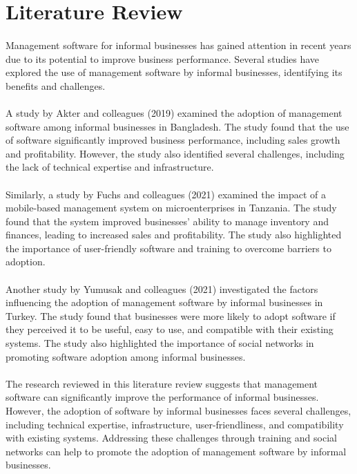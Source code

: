 \documentclass{article}
\begin{document}
\newpage


\section*{Literature Review}
\paragraph*{}
Management software for informal businesses has gained attention in recent years due to its potential to improve business performance. Several studies have explored the use of management software by informal businesses, identifying its benefits and challenges.

\paragraph*{}
A study by Akter and colleagues (2019) examined the adoption of management software among informal businesses in Bangladesh. The study found that the use of software significantly improved business performance, including sales growth and profitability. However, the study also identified several challenges, including the lack of technical expertise and infrastructure.

\paragraph*{}
Similarly, a study by Fuchs and colleagues (2021) examined the impact of a mobile-based management system on microenterprises in Tanzania. The study found that the system improved businesses' ability to manage inventory and finances, leading to increased sales and profitability. The study also highlighted the importance of user-friendly software and training to overcome barriers to adoption.

\paragraph*{}
Another study by Yumusak and colleagues (2021) investigated the factors influencing the adoption of management software by informal businesses in Turkey. The study found that businesses were more likely to adopt software if they perceived it to be useful, easy to use, and compatible with their existing systems. The study also highlighted the importance of social networks in promoting software adoption among informal businesses.

\paragraph*{}
The research reviewed in this literature review suggests that management software can significantly improve the performance of informal businesses. However, the adoption of software by informal businesses faces several challenges, including technical expertise, infrastructure, user-friendliness, and compatibility with existing systems. Addressing these challenges through training and social networks can help to promote the adoption of management software by informal businesses.
\end{document}
